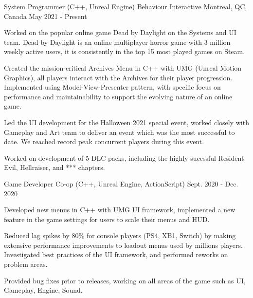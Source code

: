 

\begin{cventries}

  \cventry
    {System Programmer (C++, Unreal Engine)} %
    {Behaviour Interactive} %
    {Montreal, QC, Canada} %
    {May 2021 - Present} %
    {
      \begin{cvitems} %
\item Worked on the popular online game Dead by Daylight on the Systems and UI team. Dead by Daylight is an online multiplayer horror game with 3 million weekly active users, it is consistently in the top 15 most played games on Steam.
\item Created the mission-critical Archives Menu in C++ with UMG (Unreal Motion Graphics), all players interact with the Archives for their player progression. Implemented using Model-View-Presenter pattern, with specific focus on performance and maintainability to support the evolving nature of an online game.
\item Led the UI development for the Halloween 2021 special event, worked closely with Gameplay and Art team to deliver an event which was the most successful to date. We reached record peak concurrent players during this event.
\item Worked on development of 5 DLC packs, including the highly sucessful Resident Evil, Hellraiser, and *** chapters.
      \end{cvitems}
    }

  \cventry
    {Game Developer Co-op (C++, Unreal Engine, ActionScript)} %
    {} %
    {} %
    {Sept. 2020 - Dec. 2020} %
    {
      \begin{cvitems} %
\item Developed new menus in C++ with UMG UI framework, implemented a new feature in the game settings for users to scale their menus and HUD.
\item Reduced lag spikes by 80\% for console players (PS4, XB1, Switch) by making extensive performance improvements to loadout menus used by millions players. Investigated best practices of the UI framework, and performed reworks on problem areas.
\item Provided bug fixes prior to releases, working on all areas of the game such as UI, Gameplay, Engine, Sound.
      \end{cvitems}
    }


\end{cventries}
